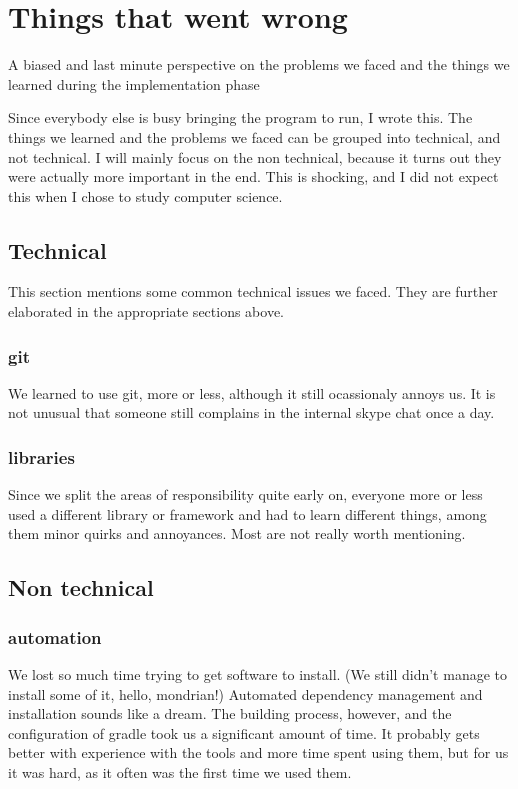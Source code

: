 \section{Things that went wrong}
A biased and last minute perspective on the problems we faced and the things we learned during the implementation phase

Since everybody else is busy bringing the program to run, I wrote this. %
The things we learned and the problems we faced can be grouped into technical,
and not technical. I will mainly focus on the non technical, because it turns out
they were actually more important in the end.
This is shocking, and I did not expect this when I chose to study computer science.
  
\subsection{Technical}
    This section mentions some common technical issues we faced. They are further elaborated in the
    appropriate sections above.
\subsubsection{git}
    We learned to use git, more or less, although it still ocassionaly annoys us.
    It is not unusual that someone still complains in the internal skype chat once a day.
\subsubsection{libraries}
    Since we split the areas of responsibility quite early on, everyone more or less used
    a different library or framework and had to learn different things, among them minor quirks and annoyances.
    Most are not really worth mentioning. %
    
\subsection{Non technical}

\subsubsection{automation}
    We lost so much time trying to get software to install. (We still 
    didn't manage to install some of it, hello, mondrian!)
    Automated dependency management and installation sounds like a dream. 
    The building process, however, and the configuration of gradle took us a significant amount of time.
    It probably gets better with experience with the tools and more time spent using them,
    but for us it was hard, as it often was the first time we used them.
    
